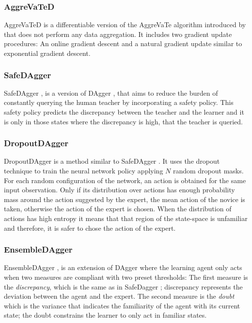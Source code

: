 \subsubsection*{AggreVaTeD}
AggreVaTeD \cite{AggreVaTeD-Sun:2017} is a differentiable version of the AggreVaTe algorithm introduced by \cite{AggreVaTe-Ross-Bagnell:2014} that does not perform any data aggregation. It includes two gradient update procedures: An online gradient descent and a natural gradient update similar to exponential gradient descent.

\subsubsection*{SafeDAgger}
SafeDAgger \cite{SafeDAgger-Zhang-Cho:2016}, is a version of DAgger \cite{DAgger-Ross:2011}, that aims to reduce the burden of constantly querying the human teacher by incorporating a safety policy. This safety policy predicts the discrepancy between the teacher and the learner and it is only in those states where the discrepancy is high, that the teacher is queried.


\subsubsection*{DropoutDAgger}
DropoutDAgger \cite{DropoutDAgger} is a method similar to SafeDAgger \cite{SafeDAgger-Zhang-Cho:2016}. It uses the dropout technique to train the neural network policy applying $N$ random dropout masks. For each random configuration of the network, an action is obtained for the same input observation. Only if its distribution over actions has enough probability mass around the action suggested by the expert, the mean action of the novice is taken, otherwise the action of the expert is chosen. When the distribution of actions has high entropy it means that that region of the state-space is unfamiliar and therefore, it is safer to chose the action of the expert.

\subsubsection*{EnsembleDAgger}
EnsembleDAgger \cite{EnsembleDAgger-Menda:2019}, is an extension of DAgger where the learning agent only acts when two measures are compliant with two preset thresholds: The first measure is the \textit{discrepancy}, which is the same as in SafeDagger \cite{SafeDAgger-Zhang-Cho:2016}; discrepancy represents the deviation between the agent and the expert. The second measure is the \textit{doubt} which is the variance that indicates the familiarity of the agent with its current state; the doubt constrains the learner to only act in familiar states. 


